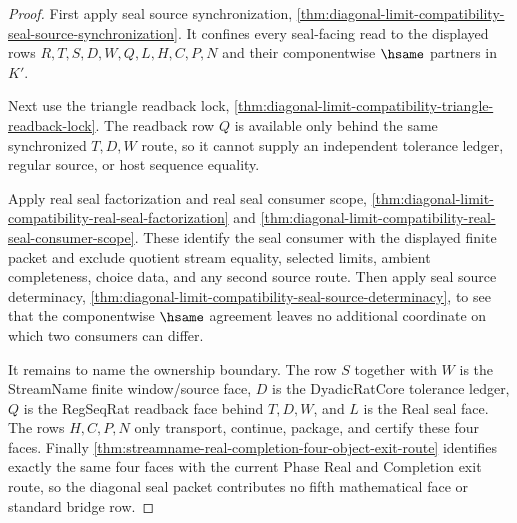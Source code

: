 \begin{proof}
First apply seal source synchronization,
\autoref{thm:diagonal-limit-compatibility-seal-source-synchronization}. It
confines every seal-facing read to the displayed rows
$R,T,S,D,W,Q,L,H,C,P,N$ and their componentwise $\hsame$ partners in $K'$.

Next use the triangle readback lock,
\autoref{thm:diagonal-limit-compatibility-triangle-readback-lock}. The
readback row $Q$ is available only behind the same synchronized $T,D,W$ route,
so it cannot supply an independent tolerance ledger, regular source, or host
sequence equality.

Apply real seal factorization and real seal consumer scope,
\autoref{thm:diagonal-limit-compatibility-real-seal-factorization} and
\autoref{thm:diagonal-limit-compatibility-real-seal-consumer-scope}. These
identify the seal consumer with the displayed finite packet and exclude
quotient stream equality, selected limits, ambient completeness, choice data,
and any second source route. Then apply seal source determinacy,
\autoref{thm:diagonal-limit-compatibility-seal-source-determinacy}, to see
that the componentwise $\hsame$ agreement leaves no additional coordinate on
which two consumers can differ.

It remains to name the ownership boundary. The row $S$ together with $W$ is
the StreamName finite window/source face, $D$ is the DyadicRatCore tolerance
ledger, $Q$ is the RegSeqRat readback face behind $T,D,W$, and $L$ is the Real
seal face. The rows $H,C,P,N$ only transport, continue, package, and certify
these four faces. Finally
\autoref{thm:streamname-real-completion-four-object-exit-route} identifies
exactly the same four faces with the current Phase Real and Completion exit
route, so the diagonal seal packet contributes no fifth mathematical face or
standard bridge row.
\end{proof}

